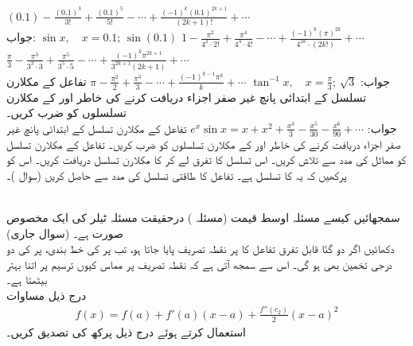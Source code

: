 $(0.1)-\frac{(0.1)^3}{3!}+\frac{(0.1)^5}{5!}-\cdots+\frac{(-1)^k(0.1)^{2k+1}}{(2k+1)!}+\cdots$\\
جواب:\quad
$\sin x,\quad x=0.1;\, \sin(0.1)$
$1-\frac{\pi^2}{4^2\cdot 2!}+\frac{\pi^4}{4^4\cdot 4!}-\cdots+\frac{(-1)^k(\pi)^{2k}}{4^{2k}\cdot (2k!)}+\cdots$
$\frac{\pi}{3}-\frac{\pi^3}{3^3\cdot 3}+\frac{\pi^5}{3^5\cdot 5}-\cdots+\frac{(-1)^k\pi^{2k+1}}{3^{2k+1}(2k+1)}+\cdots$\\
جواب:\quad
$\tan^{-1}x,\quad x=\tfrac{\pi}{3};\, \sqrt{3}$
$\pi-\frac{\pi^2}{2}+\frac{\pi^3}{3}-\cdots+\frac{(-1)^{k-1}\pi^k}{k}+\cdots$
تفاعل  کے مکلارن تسلسل کے ابتدائی پانچ غیر صفر اجزاء دریافت کرنے کی خاطر  اور  کے مکلارن تسلسلوں کو ضرب کریں۔ \\
جواب:\quad
$e^x\sin x=x+x^2+\tfrac{x^3}{3}-\tfrac{x^5}{30}-\tfrac{x^6}{90}+\cdots$
تفاعل  کے مکلارن تسلسل کے ابتدائی پانچ غیر صفر اجزاء دریافت کرنے کی خاطر  اور  کے مکلارن تسلسلوں کو  ضرب کریں۔ 
تفاعل  کے مکلارن تسلسل کو مماثل  کی مدد سے تلاش  کریں۔ اس تسلسل کا تفرق لے کر  کا مکلارن تسلسل دریافت کریں۔ اس کو پرکھیں کہ یہ  کا تسلسل ہے۔
تفاعل کا طاقتی تسلسل  کی مدد سے حاصل کریں (سوال )۔

\\
سمجھائیں کیسے مسئلہ اوسط قیمت (مسئلہ ) درحقیقت مسئلہ ٹیلر کی ایک مخصوص صورت ہے۔
 (سوال  جاری)\\
دکھائیں اگر دو گنّا قابل تفرق تفاعل  کا  پر  نقطہ تصریف پایا جاتا ہو، تب  پر  کی خط بندی،  پر کی دو درجی تخمین بھی ہو گی۔ اس سے سمجھ آتی ہے کہ نقطہ تصریف پر مماس کیوں ترسیم پر اتنا بہتر بیٹھتا ہے۔ 
\\
درج ذیل مساوات
\begin{align*}
f(x)=f(a)+f'(a)(x-a)+\frac{f''(c_2)}{2}(x-a)^2
\end{align*}
استعمال کرتے ہوئے درج ذیل پرکھ کی تصدیق کریں۔

